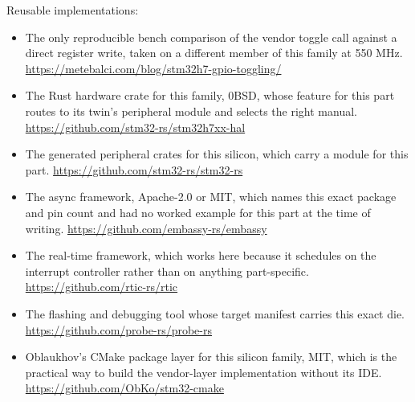 Reusable implementations:
\begin{itemize}
\item The only reproducible bench comparison of the vendor toggle call against a
direct register write, taken on a different member of this family at 550 MHz.\newline
\url{https://metebalci.com/blog/stm32h7-gpio-toggling/}
\item The Rust hardware crate for this family, 0BSD, whose feature for this part
routes to its twin's peripheral module and selects the right manual.\newline
\url{https://github.com/stm32-rs/stm32h7xx-hal}
\item The generated peripheral crates for this silicon, which carry a module for
this part.\newline
\url{https://github.com/stm32-rs/stm32-rs}
\item The async framework, Apache-2.0 or MIT, which names this exact package and
pin count and had no worked example for this part at the time of writing.\newline
\url{https://github.com/embassy-rs/embassy}
\item The real-time framework, which works here because it schedules on the
interrupt controller rather than on anything part-specific.\newline
\url{https://github.com/rtic-rs/rtic}
\item The flashing and debugging tool whose target manifest carries this exact
die.\newline
\url{https://github.com/probe-rs/probe-rs}
\item Oblaukhov's CMake package layer for this silicon family, MIT, which is the
practical way to build the vendor-layer implementation without its IDE.\newline
\url{https://github.com/ObKo/stm32-cmake}
\end{itemize}
